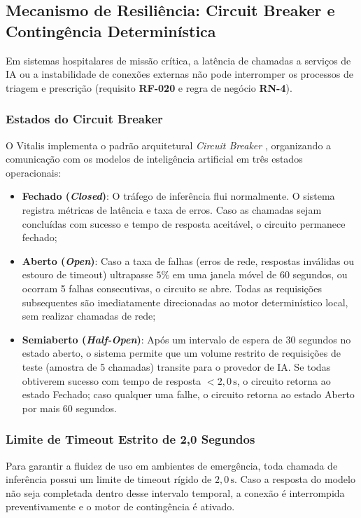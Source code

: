 \subsection{Mecanismo de Resiliência: Circuit Breaker e Contingência Determinística}
\label{subsec:ia_circuit_breaker}

Em sistemas hospitalares de missão crítica, a latência de chamadas a serviços de IA ou a instabilidade de conexões externas não pode interromper os processos de triagem e prescrição (requisito \textbf{RF-020} e regra de negócio \textbf{RN-4}).

\subsubsection{Estados do Circuit Breaker}
O Vitalis implementa o padrão arquitetural \textit{Circuit Breaker} \cite{nygard:2018}, organizando a comunicação com os modelos de inteligência artificial em três estados operacionais:

\begin{itemize}
    \item \textbf{Fechado (\textit{Closed})}: O tráfego de inferência flui normalmente. O sistema registra métricas de latência e taxa de erros. Caso as chamadas sejam concluídas com sucesso e tempo de resposta aceitável, o circuito permanece fechado;
    \item \textbf{Aberto (\textit{Open})}: Caso a taxa de falhas (erros de rede, respostas inválidas ou estouro de timeout) ultrapasse $5\%$ em uma janela móvel de 60 segundos, ou ocorram 5 falhas consecutivas, o circuito se abre. Todas as requisições subsequentes são imediatamente direcionadas ao motor determinístico local, sem realizar chamadas de rede;
    \item \textbf{Semiaberto (\textit{Half-Open})}: Após um intervalo de espera de 30 segundos no estado aberto, o sistema permite que um volume restrito de requisições de teste (amostra de 5 chamadas) transite para o provedor de IA. Se todas obtiverem sucesso com tempo de resposta $< 2{,}0\,\text{s}$, o circuito retorna ao estado Fechado; caso qualquer uma falhe, o circuito retorna ao estado Aberto por mais 60 segundos.
\end{itemize}

\subsubsection{Limite de Timeout Estrito de 2,0 Segundos}
Para garantir a fluidez de uso em ambientes de emergência, toda chamada de inferência possui um limite de timeout rígido de $2{,}0\,\text{s}$. Caso a resposta do modelo não seja completada dentro desse intervalo temporal, a conexão é interrompida preventivamente e o motor de contingência é ativado.

